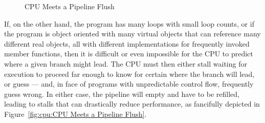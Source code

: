 \begin{figure}[htb]
\begin{center}
\end{center}
\caption{CPU Meets a Pipeline Flush}
\end{figure}

If, on the other hand, the program has many loops with small loop counts,
or if the program is object oriented with many virtual objects that
can reference many different real objects, all with different implementations
for frequently invoked member functions, then it is difficult or even
impossible for the CPU to predict where a given branch might lead.
The CPU must then either stall waiting for execution to proceed far enough
to know for certain where the branch will lead, or guess --- and, in
face of programs with unpredictable control flow, frequently guess wrong.
In either case, the pipeline will empty and have to be refilled, leading
to stalls that can drastically reduce performance,
as fancifully depicted in Figure~\ref{fig:cpu:CPU Meets a Pipeline Flush}.

